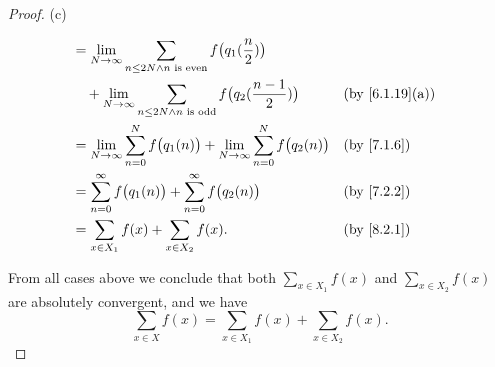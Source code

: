 \begin{proof}{(c)}
\begin{itemize}
\begin{align*}
             & = \lim_{N \to \infty} \sum_{n \leq 2N \land n \text{ is even}} f\big(q_1(\dfrac{n}{2})\big)                                                     \\
             & \quad + \lim_{N \to \infty} \sum_{n \leq 2N \land n \text{ is odd}} f\big(q_2(\dfrac{n - 1}{2})\big)          &  & \text{(by \cref{6.1.19}(a))} \\
             & = \lim_{N \to \infty} \sum_{n = 0}^N f\big(q_1(n)\big) + \lim_{N \to \infty} \sum_{n = 0}^N f\big(q_2(n)\big) &  & \by{7.1.6}                   \\
             & = \sum_{n = 0}^\infty f\big(q_1(n)\big) + \sum_{n = 0}^\infty f\big(q_2(n)\big)                               &  & \by{7.2.2}                   \\
             & = \sum_{x \in X_1} f(x) + \sum_{x \in X_2} f(x).                                                              &  & \by{8.2.1}
          \end{align*}
  \end{itemize}
  From all cases above we conclude that both \(\sum_{x \in X_1} f(x)\) and \(\sum_{x \in X_2} f(x)\) are absolutely convergent, and we have
  \[
    \sum_{x \in X} f(x) = \sum_{x \in X_1} f(x) + \sum_{x \in X_2} f(x).
  \]


\end{proof}
